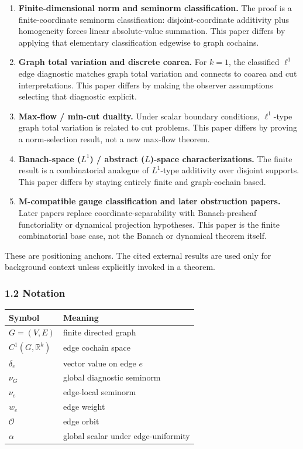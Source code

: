 \documentclass[
  11pt,
]{article}
\begin{document}
\begin{enumerate}
\def\labelenumi{\arabic{enumi}.}
\item
  \textbf{Finite-dimensional norm and seminorm classification.} The
  proof is a finite-coordinate seminorm classification:
  disjoint-coordinate additivity plus homogeneity forces linear
  absolute-value summation. This paper differs by applying that
  elementary classification edgewise to graph cochains.
\item
  \textbf{Graph total variation and discrete coarea.} For \(k=1\), the
  classified \(\ell^1\) edge diagnostic matches graph total variation
  and connects to coarea and cut interpretations. This paper differs by
  making the observer assumptions selecting that diagnostic explicit.
\item
  \textbf{Max-flow / min-cut duality.} Under scalar boundary conditions,
  \(\ell^1\)-type graph total variation is related to cut problems. This
  paper differs by proving a norm-selection result, not a new max-flow
  theorem.
\item
  \textbf{Banach-space (\(L^1\)) / abstract (\(L\))-space
  characterizations.} The finite result is a combinatorial analogue of
  \(L^1\)-type additivity over disjoint supports. This paper differs by
  staying entirely finite and graph-cochain based.
\item
  \textbf{M-compatible gauge classification and later obstruction
  papers.} Later papers replace coordinate-separability with
  Banach-presheaf functoriality or dynamical projection hypotheses. This
  paper is the finite combinatorial base case, not the Banach or
  dynamical theorem itself.
\end{enumerate}

These are positioning anchors. The cited external results are used only
for background context unless explicitly invoked in a theorem.

\hypertarget{notation}{%
\subsubsection{1.2 Notation}\label{notation}}

\begin{longtable}[]{@{}ll@{}}
\toprule\noalign{}
Symbol & Meaning \\
\midrule\noalign{}
\endhead
\bottomrule\noalign{}
\endlastfoot
\(G=(V,E)\) & finite directed graph \\
\(C^1(G,\mathbb R^k)\) & edge cochain space \\
\(\delta_e\) & vector value on edge \(e\) \\
\(\nu_G\) & global diagnostic seminorm \\
\(\nu_e\) & edge-local seminorm \\
\(w_e\) & edge weight \\
\(\mathcal O\) & edge orbit \\
\(\alpha\) & global scalar under edge-uniformity \\
\end{longtable}
\end{document}
